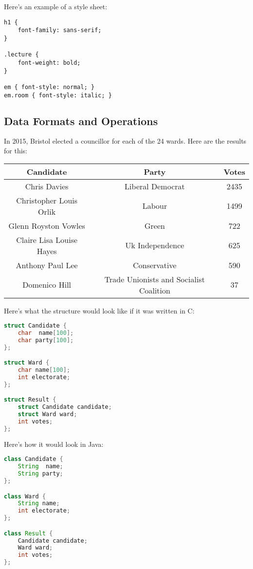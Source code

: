 \documentclass[11pt,a4paper,titlepage,dvipsnames,cmyk]{scrartcl}
\begin{document}
\begin{minipage}{\textwidth}
Here's an example of a style sheet:
\begin{lstlisting}[]
h1 {
    font-family: sans-serif;
}

.lecture {
    font-weight: bold;
}

em { font-style: normal; }
em.room { font-style: italic; }
\end{lstlisting}
\end{minipage}

\subsection{Data Formats and Operations}%
\label{sub:Data Formats and Operations}
In 2015, Bristol elected a councillor for each of the 24 wards. Here are
the results for this:
\begin{center}
    \begin{tabular}{|c|c|c|}
        \hline
        \textbf{Candidate} & \textbf{Party} & \textbf{Votes} \\
        \hline
        Chris Davies & Liberal Democrat & 2435 \\
        \hline
        Christopher Louis Orlik & Labour & 1499 \\
        \hline
        Glenn Royston Vowles & Green & 722 \\
        \hline
        Claire Lisa Louise Hayes & Uk Independence & 625 \\
        \hline
        Anthony Paul Lee & Conservative & 590 \\
        \hline
        Domenico Hill & Trade Unionists and Socialist Coalition & 37 \\
        \hline
    \end{tabular}
\end{center}

Here's what the structure would look like if it was written in C:
\begin{lstlisting}[language=c]
struct Candidate {
    char  name[100];
    char party[100];
};

struct Ward {
    char name[100];
    int electorate;
};

struct Result {
    struct Candidate candidate;
    struct Ward ward;
    int votes;
};
\end{lstlisting}

\begin{minipage}{\textwidth}
Here's how it would look in Java:
\begin{lstlisting}[language=java]
class Candidate {
    String  name;
    String party;
};

class Ward {
    String name;
    int electorate;
};

class Result {
    Candidate candidate;
    Ward ward;
    int votes;
};
\end{lstlisting}
\end{minipage}
\end{document}
